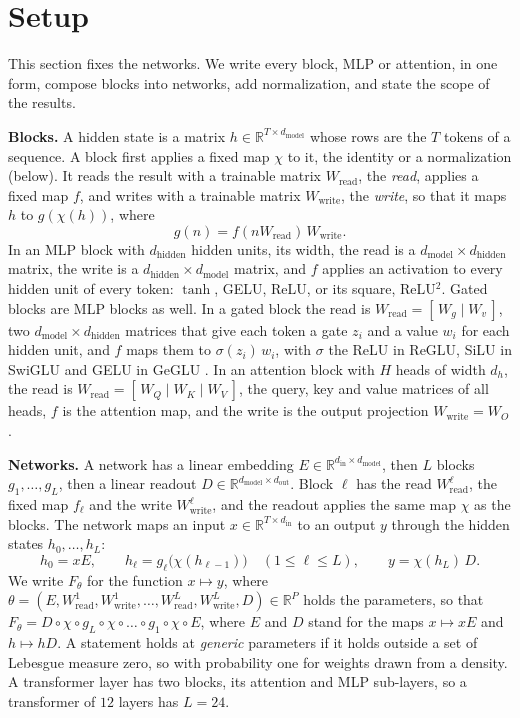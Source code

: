 \documentclass[10pt]{article}
\theoremstyle{definition}
\theoremstyle{remark}
\newcommand{\R}{\mathbb{R}}
\newcommand{\Wread}{W_{\mathrm{read}}}
\newcommand{\Wwrite}{W_{\mathrm{write}}}
\newcommand{\dm}{d_{\mathrm{model}}}
\newcommand{\dhid}{d_{\mathrm{hidden}}}
\newcommand{\para}[1]{\smallskip\noindent\textbf{#1}\hspace{0.5em}}
\begin{document}
\section{Setup}\label{sec:setup}

This section fixes the networks. We write every block, MLP or attention, in one form, compose blocks into networks, add normalization, and state the scope of the results.

\para{Blocks.} A hidden state is a matrix $h \in \R^{T\times\dm}$ whose rows are the $T$ tokens of a sequence. A block first applies a fixed map $\chi$ to it, the identity or a normalization (below). It reads the result with a trainable matrix $\Wread$, the \emph{read}, applies a fixed map $f$, and writes with a trainable matrix $\Wwrite$, the \emph{write}, so that it maps $h$ to $g(\chi(h))$, where
\begin{equation}\label{eq:block}
g(n) = f(n\Wread)\,\Wwrite.
\end{equation}
In an MLP block with $\dhid$ hidden units, its width, the read is a $\dm\times\dhid$ matrix, the write is a $\dhid\times\dm$ matrix, and $f$ applies an activation to every hidden unit of every token: $\tanh$, GELU, ReLU, or its square, ReLU$^2$. Gated blocks are MLP blocks as well. In a gated block the read is $\Wread = [\,W_g \mid W_v\,]$, two $\dm\times\dhid$ matrices that give each token a gate $z_i$ and a value $w_i$ for each hidden unit, and $f$ maps them to $\sigma(z_i)\,w_i$, with $\sigma$ the ReLU in ReGLU, SiLU in SwiGLU and GELU in GeGLU \citep{shazeer2020glu}. In an attention block with $H$ heads of width $d_h$, the read is $\Wread = [\,W_Q \mid W_K \mid W_V\,]$, the query, key and value matrices of all heads, $f$ is the attention map, and the write is the output projection $\Wwrite = W_O$.

\para{Networks.} A network has a linear embedding $E \in \R^{d_{\mathrm{in}}\times\dm}$, then $L$ blocks $g_1, \dots, g_L$, then a linear readout $D \in \R^{\dm\times d_{\mathrm{out}}}$. Block $\ell$ has the read $\Wread^{\ell}$, the fixed map $f_\ell$ and the write $\Wwrite^{\ell}$, and the readout applies the same map $\chi$ as the blocks. The network maps an input $x \in \R^{T\times d_{\mathrm{in}}}$ to an output $y$ through the hidden states $h_0, \dots, h_L$:
\begin{equation}\label{eq:nets}
h_0 = xE, \qquad h_\ell = g_\ell\big(\chi(h_{\ell-1})\big) \quad (1 \le \ell \le L), \qquad y = \chi(h_L)\,D .
\end{equation}
We write $F_\theta$ for the function $x \mapsto y$, where $\theta = (E, \Wread^{1}, \Wwrite^{1}, \dots, \Wread^{L}, \Wwrite^{L}, D) \in \R^P$ holds the parameters, so that $F_\theta = D \circ \chi \circ g_L \circ \chi \circ \dots \circ g_1 \circ \chi \circ E$, where $E$ and $D$ stand for the maps $x \mapsto xE$ and $h \mapsto hD$. A statement holds at \emph{generic} parameters if it holds outside a set of Lebesgue measure zero, so with probability one for weights drawn from a density. A transformer layer has two blocks, its attention and MLP sub-layers, so a transformer of $12$ layers has $L = 24$.
\end{document}
